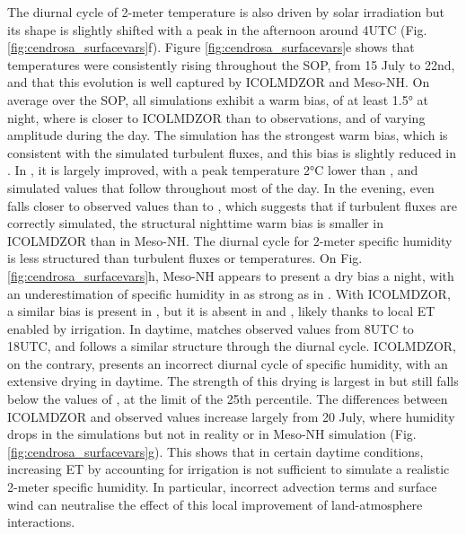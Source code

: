 The diurnal cycle of 2-meter temperature is also driven by solar irradiation but its shape is slightly shifted with a peak in the afternoon around 4UTC (Fig. \ref{fig:cendrosa_surfacevars}f). Figure \ref{fig:cendrosa_surfacevars}e shows that temperatures were consistently rising throughout the SOP, from 15 July to 22nd, and that this evolution is well captured by ICOLMDZOR and Meso-NH.
On average over the SOP, all simulations exhibit a warm bias, of at least 1.5° at night, where \mesoexact is closer to ICOLMDZOR than to observations, and of varying amplitude during the day. The \irr simulation has the strongest warm bias, which is consistent with the simulated turbulent fluxes, and this bias is slightly reduced in \irr. In \irrboost, it is largely improved, with a peak temperature 2°C lower than \irr, and simulated values that follow \mesomean throughout most of the day. In the evening, \irrboost even falls closer to observed values than to \mesomean, which suggests that if turbulent fluxes are correctly simulated, the structural nighttime warm bias is smaller in ICOLMDZOR than in Meso-NH.
The diurnal cycle for 2-meter specific humidity is less structured than turbulent fluxes or temperatures.
On Fig. \ref{fig:cendrosa_surfacevars}h, Meso-NH appears to present a dry bias a night, with an underestimation of specific humidity in \mesoexact as strong as in \mesomean. With ICOLMDZOR, a similar bias is present in \noirr, but it is absent in \irr and \irrboost, likely thanks to local ET enabled by irrigation.
In daytime, \mesoexact matches observed values from 8UTC to 18UTC, and \mesomean follows a similar structure through the diurnal cycle. 
ICOLMDZOR, on the contrary, presents an incorrect diurnal cycle of specific humidity, with an extensive drying in daytime. The strength of this drying is largest in \noirr but \irrboost still falls below the values of \mesomean, at the limit of the 25th percentile. 
The differences between ICOLMDZOR and observed values increase largely from 20 July, where humidity drops in the simulations but not in reality or in Meso-NH simulation (Fig. \ref{fig:cendrosa_surfacevars}g).
This shows that in certain daytime conditions, increasing ET by accounting for irrigation is not sufficient to simulate a realistic 2-meter specific humidity. In particular, incorrect advection terms and surface wind can neutralise the effect of this local improvement of land-atmosphere interactions.

